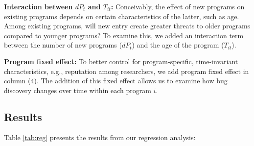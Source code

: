 \textbf{Interaction between $dP_t$ and $T_{it}$:} Conceivably, the effect of new programs on existing programs depends on certain characteristics of the latter, such as age. Among existing programs, will new entry create greater threats to older programs compared to younger programs? To examine this, we added an interaction term between the number of new programs ($dP_t$) and the age of the program ($T_{it}$).

\textbf{Program fixed effect:} To better control for program-specific, time-invariant characteristics, e.g., reputation among researchers, we add program fixed effect in column (4). The addition of this fixed effect allows us to examine how bug discovery changes over time within each program $i$.


\subsection{Results}

Table \ref{tab:reg} presents the results from our regression analysis:

